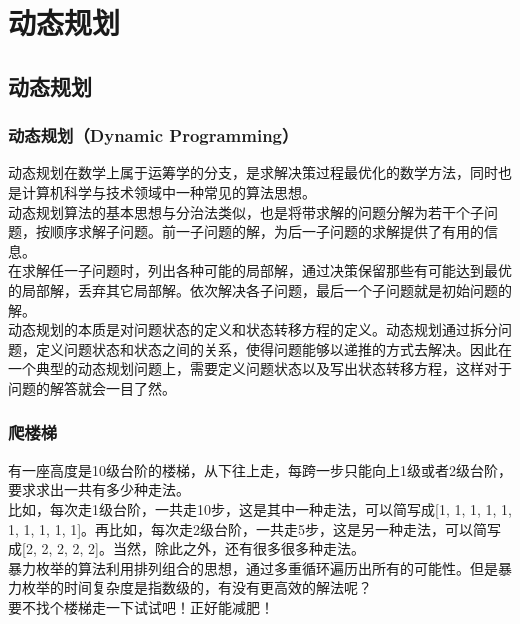 \chapter{动态规划}

\section{动态规划}

\subsection{动态规划（Dynamic Programming）}

动态规划在数学上属于运筹学的分支，是求解决策过程最优化的数学方法，同时也是计算机科学与技术领域中一种常见的算法思想。 \\

动态规划算法的基本思想与分治法类似，也是将带求解的问题分解为若干个子问题，按顺序求解子问题。前一子问题的解，为后一子问题的求解提供了有用的信息。 \\

在求解任一子问题时，列出各种可能的局部解，通过决策保留那些有可能达到最优的局部解，丢弃其它局部解。依次解决各子问题，最后一个子问题就是初始问题的解。 \\

动态规划的本质是对问题状态的定义和状态转移方程的定义。动态规划通过拆分问题，定义问题状态和状态之间的关系，使得问题能够以递推的方式去解决。因此在一个典型的动态规划问题上，需要定义问题状态以及写出状态转移方程，这样对于问题的解答就会一目了然。

\subsection{爬楼梯}

有一座高度是10级台阶的楼梯，从下往上走，每跨一步只能向上1级或者2级台阶，要求求出一共有多少种走法。 \\

比如，每次走1级台阶，一共走10步，这是其中一种走法，可以简写成[1, 1, 1, 1, 1, 1, 1, 1, 1, 1]。再比如，每次走2级台阶，一共走5步，这是另一种走法，可以简写成[2, 2, 2, 2, 2]。当然，除此之外，还有很多很多种走法。 \\

暴力枚举的算法利用排列组合的思想，通过多重循环遍历出所有的可能性。但是暴力枚举的时间复杂度是指数级的，有没有更高效的解法呢？ \\

要不找个楼梯走一下试试吧！正好能减肥！ \\

